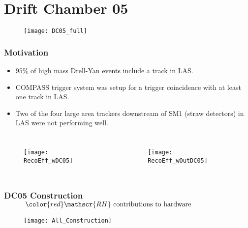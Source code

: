 \ifpdf
\graphicspath{ {Chapters/DC05/Figs/} }
\section{Drift Chamber 05}

\begin{frame}
  \begin{figure}
    \texttt{[image: DC05\_full]}
  \end{figure}
\end{frame}

\begin{frame}
  \frametitle{Motivation}
  
  \begin{itemize}
  \item 95\% of high mass Drell-Yan events include a track in LAS.
  \item COMPASS trigger system was setup for a trigger coincidence
    with at least one track in LAS.
  \item Two of the four large area trackers downstream of SM1 (straw
    detectors) in LAS were not performing well.
  \end{itemize}
  
  \begin{columns}
    \begin{figure}
      \texttt{[image: RecoEff\_wDC05]}
    \end{figure}
    \begin{figure}
      \texttt{[image: RecoEff\_wOutDC05]}
    \end{figure}
  \end{columns}  
  
\end{frame}


\begin{frame}%
  \frametitle{DC05 Construction $\qquad \quad \color{red} \mathscr{RH} \text{ contributions to hardware}$}

  \begin{figure}
    \texttt{[image: All\_Construction]}
  \end{figure}
\end{frame}


